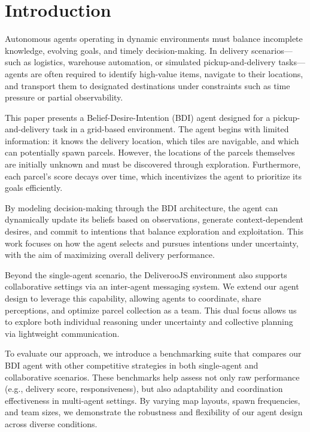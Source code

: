 
\section{Introduction}

Autonomous agents operating in dynamic environments must balance incomplete knowledge, evolving goals, and timely decision-making. In delivery scenarios—such as logistics, warehouse automation, or simulated pickup-and-delivery tasks—agents are often required to identify high-value items, navigate to their locations, and transport them to designated destinations under constraints such as time pressure or partial observability.

This paper presents a Belief-Desire-Intention (BDI) agent designed for a pickup-and-delivery task in a grid-based environment. The agent begins with limited information: it knows the delivery location, which tiles are navigable, and which can potentially spawn parcels. However, the locations of the parcels themselves are initially unknown and must be discovered through exploration. Furthermore, each parcel's score decays over time, which incentivizes the agent to prioritize its goals efficiently.

By modeling decision-making through the BDI architecture, the agent can dynamically update its beliefs based on observations, generate context-dependent desires, and commit to intentions that balance exploration and exploitation. This work focuses on how the agent selects and pursues intentions under uncertainty, with the aim of maximizing overall delivery performance.

Beyond the single-agent scenario, the DeliverooJS environment also supports collaborative settings via an inter-agent messaging system. We extend our agent design to leverage this capability, allowing agents to coordinate, share perceptions, and optimize parcel collection as a team. This dual focus allows us to explore both individual reasoning under uncertainty and collective planning via lightweight communication.

To evaluate our approach, we introduce a benchmarking suite that compares our BDI agent with other competitive strategies in both single-agent and collaborative scenarios. These benchmarks help assess not only raw performance (e.g., delivery score, responsiveness), but also adaptability and coordination effectiveness in multi-agent settings. By varying map layouts, spawn frequencies, and team sizes, we demonstrate the robustness and flexibility of our agent design across diverse conditions.
